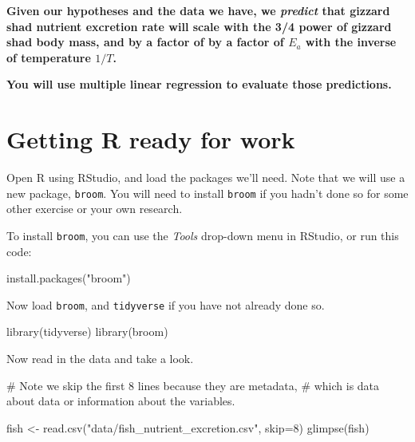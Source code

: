 \documentclass[
  letterpaper,
  DIV=11,
  numbers=noendperiod]{scrreprt}
\newenvironment{Shaded}{\begin{snugshade}}{\end{snugshade}}
\newcommand{\AttributeTok}[1]{\textcolor[rgb]{0.40,0.45,0.13}{#1}}
\newcommand{\CommentTok}[1]{\textcolor[rgb]{0.37,0.37,0.37}{#1}}
\newcommand{\DecValTok}[1]{\textcolor[rgb]{0.68,0.00,0.00}{#1}}
\newcommand{\FunctionTok}[1]{\textcolor[rgb]{0.28,0.35,0.67}{#1}}
\newcommand{\NormalTok}[1]{\textcolor[rgb]{0.00,0.23,0.31}{#1}}
\newcommand{\OtherTok}[1]{\textcolor[rgb]{0.00,0.23,0.31}{#1}}
\newcommand{\StringTok}[1]{\textcolor[rgb]{0.13,0.47,0.30}{#1}}
\begin{document}
\textbf{Given our hypotheses and the data we have, we \emph{predict}
that gizzard shad nutrient excretion rate will scale with the 3/4 power
of gizzard shad body mass, and by a factor of by a factor of \(E_a\)
with the inverse of temperature \(1/T\).}

\textbf{You will use multiple linear regression to evaluate those
predictions.}

\section{Getting R ready for work}\label{getting-r-ready-for-work}

Open R using RStudio, and load the packages we'll need. Note that we
will use a new package, \texttt{broom}. You will need to install
\texttt{broom} if you hadn't done so for some other exercise or your own
research.

To install \texttt{broom}, you can use the \emph{Tools} drop-down menu
in RStudio, or run this code:

\begin{Shaded}
\begin{Highlighting}[]
\FunctionTok{install.packages}\NormalTok{(}\StringTok{"broom"}\NormalTok{)}
\end{Highlighting}
\end{Shaded}

Now load \texttt{broom}, and \texttt{tidyverse} if you have not already
done so.

\begin{Shaded}
\begin{Highlighting}[]
\FunctionTok{library}\NormalTok{(tidyverse)}
\FunctionTok{library}\NormalTok{(broom)}
\end{Highlighting}
\end{Shaded}

Now read in the data and take a look.

\begin{Shaded}
\begin{Highlighting}[]
\CommentTok{\# Note we skip the first 8 lines because they are \textquotesingle{}metadata\textquotesingle{},}
\CommentTok{\# which is \textquotesingle{}data about data\textasciigrave{} or information about the variables.}

\NormalTok{fish }\OtherTok{\textless{}{-}} \FunctionTok{read.csv}\NormalTok{(}\StringTok{"data/fish\_nutrient\_excretion.csv"}\NormalTok{, }\AttributeTok{skip=}\DecValTok{8}\NormalTok{)}
\FunctionTok{glimpse}\NormalTok{(fish)}
\end{Highlighting}
\end{Shaded}
\end{document}
